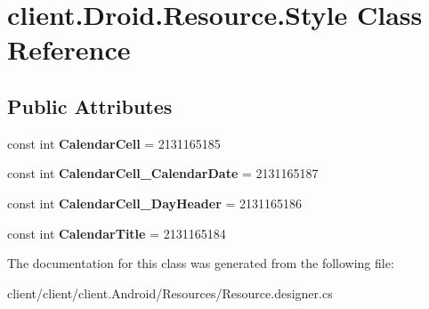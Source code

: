 \hypertarget{classclient_1_1Droid_1_1Resource_1_1Style}{\section{client.\-Droid.\-Resource.\-Style Class Reference}
\label{classclient_1_1Droid_1_1Resource_1_1Style}
}
\subsection*{Public Attributes}
\begin{DoxyCompactItemize}
\item 
\hypertarget{classclient_1_1Droid_1_1Resource_1_1Style_a461e6e216c9ac2b864d131cd2e7e8dde}{const int {\bfseries Calendar\-Cell} = 2131165185}\label{classclient_1_1Droid_1_1Resource_1_1Style_a461e6e216c9ac2b864d131cd2e7e8dde}

\item 
\hypertarget{classclient_1_1Droid_1_1Resource_1_1Style_a13a80191ff9a551b5f46fc154b98f843}{const int {\bfseries Calendar\-Cell\-\_\-\-Calendar\-Date} = 2131165187}\label{classclient_1_1Droid_1_1Resource_1_1Style_a13a80191ff9a551b5f46fc154b98f843}

\item 
\hypertarget{classclient_1_1Droid_1_1Resource_1_1Style_a4f49e011da05ea0d1303b6c0608df0b3}{const int {\bfseries Calendar\-Cell\-\_\-\-Day\-Header} = 2131165186}\label{classclient_1_1Droid_1_1Resource_1_1Style_a4f49e011da05ea0d1303b6c0608df0b3}

\item 
\hypertarget{classclient_1_1Droid_1_1Resource_1_1Style_a5892fbc40f9abceb5600ceb12d501428}{const int {\bfseries Calendar\-Title} = 2131165184}\label{classclient_1_1Droid_1_1Resource_1_1Style_a5892fbc40f9abceb5600ceb12d501428}

\end{DoxyCompactItemize}


The documentation for this class was generated from the following file\-:\begin{DoxyCompactItemize}
\item 
client/client/client.\-Android/\-Resources/Resource.\-designer.\-cs\end{DoxyCompactItemize}
